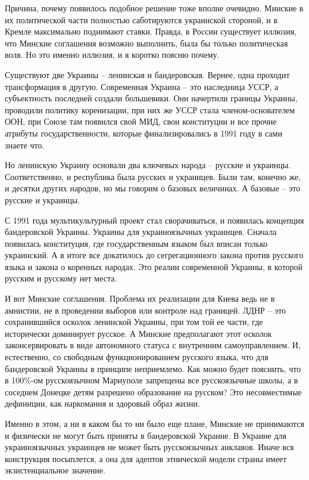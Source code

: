 Причина, почему появилось подобное решение тоже вполне очевидно. Минские в их
политической части полностью саботируются украинской стороной, и в Кремле
максимально поднимают ставки. Правда, в России существует иллюзия, что Минские
соглашения возможно выполнить, была бы только политическая воля. Но это именно
иллюзия, и я коротко поясню почему.

Существуют две Украины – ленинская и бандеровская. Вернее, одна проходит
трансформация в другую. Современная Украина – это наследница УССР, а
субъектность последней создали большевики. Они начертили границы Украины,
проводили политику коренизации, при них же УССР стала членом-основателем ООН,
при Союзе там появился свой МИД, свои конституции и все прочие атрибуты
государственности, которые финализировались в 1991 году в сами знаете что.

Но ленинскую Украину основали два ключевых народа – русские и украинцы.
Соответственно, и республика была русских и украинцев. Были там, конечно же, и
десятки других народов, но мы говорим о базовых величинах. А базовые – это
русские и украинцы.

С 1991 года мультикультурный проект стал сворачиваться, и появилась концепция
бандеровской Украины. Украины для украиноязычных украинцев. Сначала появилась
конституция, где государственным языком был вписан только украинский. А в итоге
все докатилось до сегрегационного закона против русского языка и закона о
коренных народах. Это реалии современной Украины, в которой русским и русскому
нет места.

И вот Минские соглашения. Проблема их реализации для Киева ведь не в амнистии,
не в проведении выборов или контроле над границей. ЛДНР – это сохранившийся
осколок ленинской Украины, при том той ее части, где исторически доминирует
русское. А Минские предполагают этот осколок законсервировать в виде
автономного статуса с внутренним самоуправлением. И, естественно, со свободным
функционированием русского языка, что для бандеровской Украины в принципе
неприемлемо. Как можно будет пояснить, что в 100\%-ом русскоязычном Мариуполе
запрещены все русскоязычные школы, а в соседнем Донецке детям разрешено
образование на русском? Это несовместимые дефиниции, как наркомания и здоровый
образ жизни.

Именно в этом, а ни в каком бы то ни было еще плане, Минские не принимаются и
физически не могут быть приняты в бандеровской Украине. В Украине для
украиноязычных украинцев не может быть русскоязычных анклавов. Иначе вся
конструкция посыплется, а она для адептов этнической модели страны имеет
экзистенциальное значение.
